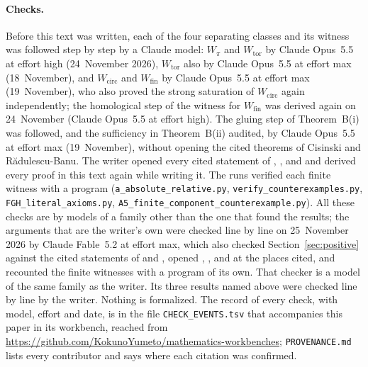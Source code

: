 \documentclass[11pt,a4paper]{article}
\theoremstyle{definition}
\newcommand{\Wpi}{W_{\pi}}
\newcommand{\Wcirc}{W_{\mathrm{circ}}}
\newcommand{\Wtor}{W_{\mathrm{tor}}}
\newcommand{\Wfin}{W_{\mathrm{fin}}}
\begin{document}
\paragraph{Checks.} Before this text was written, each of the four separating classes and its
witness was followed step by step by a Claude model: $\Wpi$ and $\Wtor$ by Claude Opus~5.5 at
effort high (24~November 2026), $\Wtor$ also by Claude Opus~5.5 at effort max (18~November),
and $\Wcirc$ and $\Wfin$ by Claude Opus~5.5 at effort max (19~November), who also proved the
strong saturation of $\Wcirc$ again independently; the homological step of the witness for
$\Wfin$ was derived again on 24~November (Claude Opus~5.5 at effort high). The gluing step of
Theorem~B(i) was followed, and the sufficiency in Theorem~B(ii) audited, by Claude Opus~5.5 at
effort max (19~November), without opening the cited theorems of Cisinski and
Rădulescu-Banu. The writer opened every cited statement of \cite{Cis06}, \cite{RB09}, \cite{Der} and
\cite{DerXVIII} and derived every proof in this text again while writing it. The runs verified each
finite witness with a program (\texttt{a\_absolute\_relative.py},
\texttt{verify\_counterexamples.py}, \texttt{FGH\_literal\_axioms.py},
\texttt{A5\_finite\_component\_counterexample.py}). All these checks are by models of a family
other than the one that found the results; the arguments that are the writer's own were checked line by
line on 25~November 2026 by Claude Fable~5.2 at effort max, which also checked
Section~\ref{sec:positive} against the cited statements of \cite{Cis06} and \cite{RB09},
opened \cite{Bro06}, \cite{Hat02}, \cite{Qui73} and \cite{Mal05} at the places cited, and
recounted the finite witnesses with a program of its own. That checker is a model of the same
family as the writer. Its three results named above were checked line by line by the
writer. Nothing is formalized. The record of every check, with model, effort and
date, is in the file \texttt{CHECK\_EVENTS.tsv} that accompanies this paper in its workbench,
reached from \url{https://github.com/KokunoYumeto/mathematics-workbenches};
\texttt{PROVENANCE.md} lists every contributor and says where each citation was confirmed.
\end{document}
